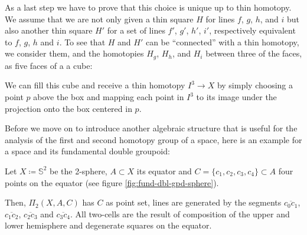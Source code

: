 \begin{defn}
As a last step we have to prove that this choice is unique up to thin homotopy.
We assume that we are not only given a thin square $H$ for
lines $f$, $g$, $h$, and $i$ but also another thin square $H'$ for a set of lines
$f'$, $g'$, $h'$, $i'$, respectively equivalent to $f$, $g$, $h$ and $i$.
To see that $H$ and $H'$ can be ``connected'' with a thin homotopy,
we consider them, and the homotopies $H_g$, $H_h$, and $H_i$ between three of the faces,
as five faces of a a cube:

\begin{center}
\end{center}

We can fill this cube and receive a thin homotopy $I^3 \to X$ by simply choosing
a point $p$ above the box and mapping each point in $I^3$ to its image under the
projection onto the box centered in $p$.
\end{defn}

Before we move on to introduce another algebraic structure that is useful for
the analysis of the first and second homotopy group of a space, here is an example
for a space and its fundamental double groupoid:

\begin{example}
Let $X \coloneqq \mathbb{S}^2$ be the 2-sphere, $A \subset X$ its equator and
$C = \{c_1, c_2, c_3, c_4\} \subset A$ four points on the equator (see
figure \ref{fig:fund-dbl-gpd-sphere}).

Then, $\Pi_2(X, A, C)$ has $C$ as point set, lines are generated by the segments
$\overline{c_0 c_1}$, $\overline{c_1 c_2}$, $\overline{c_2 c_3}$ and
$\overline{c_3 c_4}$.
All two-cells are the result of composition of the upper and lower hemisphere
and degenerate squares on the equator.
\end{example}

